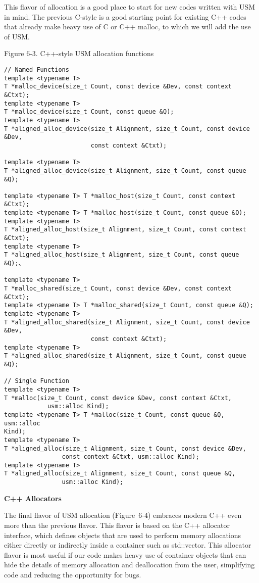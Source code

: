 This flavor of allocation is a good place to start for new codes written with USM in mind. The previous C-style is a good starting point for existing C++ codes that already make heavy use of C or C++ malloc, to which we will add the use of USM.\par

\hspace*{\fill} \par %
Figure 6-3. C++-style USM allocation functions
\begin{lstlisting}[caption={}]
// Named Functions
template <typename T>
T *malloc_device(size_t Count, const device &Dev, const context &Ctxt); 
template <typename T> 
T *malloc_device(size_t Count, const queue &Q); 
template <typename T>
T *aligned_alloc_device(size_t Alignment, size_t Count, const device &Dev,
						const context &Ctxt); 

template <typename T>
T *aligned_alloc_device(size_t Alignment, size_t Count, const queue &Q); 

template <typename T> T *malloc_host(size_t Count, const context &Ctxt);
template <typename T> T *malloc_host(size_t Count, const queue &Q);
template <typename T>
T *aligned_alloc_host(size_t Alignment, size_t Count, const context &Ctxt);
template <typename T>
T *aligned_alloc_host(size_t Alignment, size_t Count, const queue &Q);、

template <typename T>
T *malloc_shared(size_t Count, const device &Dev, const context &Ctxt);
template <typename T> T *malloc_shared(size_t Count, const queue &Q);
template <typename T>
T *aligned_alloc_shared(size_t Alignment, size_t Count, const device &Dev,
						const context &Ctxt);				
template <typename T>
T *aligned_alloc_shared(size_t Alignment, size_t Count, const queue &Q);

// Single Function
template <typename T>
T *malloc(size_t Count, const device &Dev, const context &Ctxt,
			usm::alloc Kind);
template <typename T> T *malloc(size_t Count, const queue &Q, usm::alloc
Kind);
template <typename T>
T *aligned_alloc(size_t Alignment, size_t Count, const device &Dev,
				const context &Ctxt, usm::alloc Kind);
template <typename T>
T *aligned_alloc(size_t Alignment, size_t Count, const queue &Q,
				usm::alloc Kind);
\end{lstlisting}

\hspace*{\fill} \par %
\textbf{C++ Allocators}

The final flavor of USM allocation (Figure 6-4) embraces modern C++ even more than the previous flavor. This flavor is based on the C++ allocator interface, which defines objects that are used to perform memory allocations either directly or indirectly inside a container such as std::vector. This allocator flavor is most useful if our code makes heavy use of container objects that can hide the details of memory allocation and deallocation from the user, simplifying code and reducing the opportunity for bugs.\par

